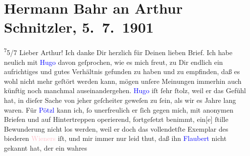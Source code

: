 

               \section[Hermann Bahr an Arthur Schnitzler, 5. 7. 1901]{ Hermann Bahr an Arthur Schnitzler, 5. 7. 1901}\nopagebreak{}\rehead{ }\normalsize\beginnumbering{} \toendnotes[C]{\smallbreak\pagebreak[2]} 
\toendnotes[C]{\smallbreak}\pstart
           \raggedleft{}{\pb}\substVorne{}\textsuperscript{7}\substDazwischen{}5\substHinten{}/7\pend
           \pstart\center{}Lieber Arthur!\pend\pstart
           Ich danke Dir herzlich für Deinen lieben Brief. Ich habe neulich mit \textcolor{blue}{Hugo}{}\ledrightnote{\textcolor{blue}{Hugo von Hofmannsthal}} davon geſprochen, wie es mich freut, zu Dir endlich ein
               aufrichtiges und gutes Verhältnis gefunden zu haben und zu empfinden, daß \introOben{}es\introOben{} wohl nicht mehr geſtört werden kann, mögen unſere Meinungen
               immerhin auch künftig noch manchmal auseinandergehen.\pend
           \pstart
           {\pb}\textcolor{blue}{Hugo}{}\ledrightnote{\textcolor{blue}{Hugo von Hofmannsthal}} iſt ſehr ſtolz, weil er das Gefühl hat, in
               dieſer Sache von jeher geſcheiter geweſen zu ſein, als wir es Jahre lang waren.\pend
           \pstart
           Für \textcolor{blue}{Pötzl}{}\ledrightnote{\textcolor{blue}{Eduard Pötzl}} kann ich, ſo unerfreulich er ſich gegen
               mich, mit anonymen Briefen und auf Hintertreppen operierend, fortgeſetzt benimmt,
                  ein{[}e{]}{ }ſtille Bewunderung nicht los werden, weil er doch
               das vollendet{\pb}ſte Exemplar des biederen \textcolor{pink}{Wieners}{}\ledrightnote{\textcolor{pink}{Wien}} iſt, und mir immer nur leid thut, daß ihn \textcolor{blue}{Flaubert}{}\ledrightnote{\textcolor{blue}{Gustave Flaubert}} nicht gekannt hat, der ein wahres
